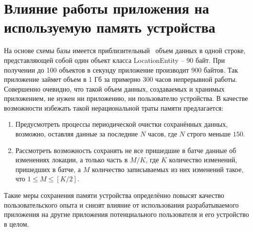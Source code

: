 \section{Влияние работы приложения на используемую память устройства}
На основе схемы базы имеется приблизительный~\autocite{sqlite_datatypes} объем данных в одной строке, представляющей собой один объект класса LocationEntity – 90 байт. При получении до 100 объектов в секунду приложение производит 900 байтов. Так приложение займет объем в 1 Гб за примерно 300 часов непрерывной работы. Совершенно очевидно, что такой объем данных, создаваемых и хранимых приложением, не нужен ни приложению, ни пользователю устройства. 
В качестве возможности избежать такой нерациональной траты памяти предлагается:
\begin{enumerate}
	\item Предусмотреть процессы периодической очистки сохранённых данных, возможно, оставляя данные за последние $N$ часов, где $N$ строго меньше $150$.
	\item Рассмотреть возможность сохранять не все пришедшие в батче данные об изменениях локации, а только часть в $M/K$, где $K$ \textemdash\space количество изменений, пришедших в батче, а $M$ \textemdash\space количество записываемых из них изменений такое, что $1 \le M \le [K/2]$.
\end{enumerate}
\smallskip
Такие меры сохранения памяти устройства определённо повысят качество пользовательского опыта и снизят влияние от использования разрабатываемого приложения на другие приложения потенциального пользователя и его устройство в целом.
